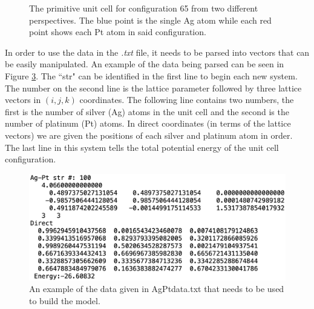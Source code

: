 \begin{figure}
\begin{subfigure}{0.23\textwidth}
    \label{primitiveSecond}
  \end{subfigure}%
\caption{The primitive unit cell for configuration 65 from two different perspectives. The blue point is the single Ag atom while each red point shows each Pt atom in said configuration.} \label{primitiveUnitCells}
\end{figure}

\par In order to use the data in the \textit{.txt} file, it needs to be parsed into vectors that can be easily manipulated. An example of the data being parsed can be seen in Figure \ref{system2data}. The ``str" can be identified in the first line to begin each new system. The number on the second line is the lattice parameter followed by three lattice vectors in $(i,j,k)$ coordinates. The following line contains two numbers, the first is the number of silver (Ag) atoms in the unit cell and the second is the number of platinum (Pt) atoms. In direct coordinates (in terms of the lattice vectors) we are given the positions of each silver and platinum atom in order. The last line in this system tells the total potential energy of the unit cell configuration. 

\begin{figure}[h]
\includegraphics[scale = 0.3]{Figures/system2}
\caption{An example of the data given in AgPtdata.txt that needs to be used to build the model.
\label{system2data}} 
\end{figure}

